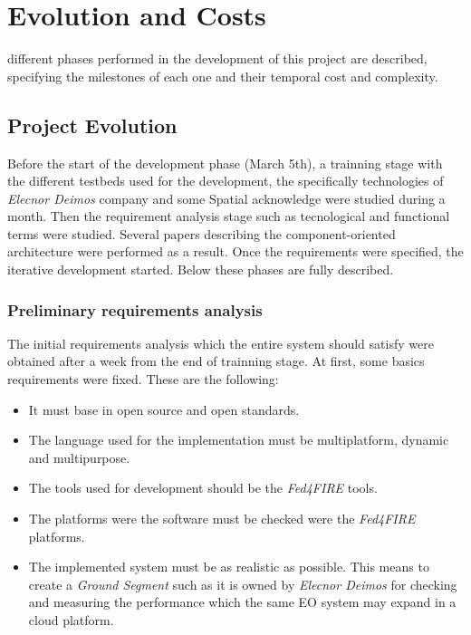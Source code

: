 \chapter{Evolution and Costs}
\label{chap:evolution}
 different phases performed in the development of this project are described,
specifying the milestones of each one and their temporal cost and complexity.


\section{Project Evolution}
\label{section:evolution}

Before the start of the development phase (March 5th), a trainning stage with
the different testbeds used for the development, the specifically technologies of
\emph{Elecnor Deimos} company and some Spatial acknowledge were studied during a month. Then the
requirement analysis stage such as tecnological and functional terms were
studied. Several papers describing the component-oriented architecture were
performed as a result. Once the requirements were specified, the iterative
development started. Below these phases are fully described.


\subsection{Preliminary requirements analysis}

The initial requirements analysis which the entire system should satisfy were
obtained after a week from the end of trainning stage.
At first, some basics requirements were fixed. These are the following:
\begin{itemize}
\item It must base in open source and open standards.
\item The language used for the implementation must be multiplatform, dynamic
  and multipurpose.
\item The tools used for development should be the \emph{Fed4FIRE} tools.
\item The platforms were the software must be checked were the \emph{Fed4FIRE}
  platforms.
\item The implemented system must be as realistic as possible. This means to
  create a \emph{Ground Segment} such as it is owned by \emph{Elecnor Deimos}
  for checking and measuring the performance which the same \acl{EO} system may
  expand in a cloud platform.
\end{itemize}

